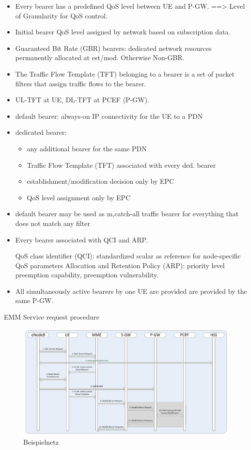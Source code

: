 \begin{itemize}
\item 	Every bearer has a predefined QoS level between UE and P-GW.
		==> Level of Granularity for QoS control.
\item	Initial bearer QoS level assigned by network based on subscription data.
\item	Guaranteed Bit Rate (GBR) bearers: dedicated network resources permanently allocated at est/mod. Otherwise Non-GBR.
\item	The Traffic Flow Template (TFT) belonging to a bearer is a set of packet filters that assign traffic flows to the bearer.
\item	UL-TFT at UE, DL-TFT at PCEF (P-GW).
\item 	default bearer: always-on IP connectivity for the UE to a PDN
\item	dedicated bearer:   
			\begin{itemize}
				\item any additional bearer for the same PDN
				\item Traffic Flow Template (TFT) associated with every ded. bearer
				\item establishment/modification decision only by EPC
				\item QoS level assignment only by EPC
			\end{itemize}

\item	default bearer may be used as {m,c}atch-all traffic bearer for everything that does not match any filter
\item	Every bearer associated with QCI and ARP.

QoS class identifier (QCI): standardized scalar as reference for node-specific QoS parameters
Allocation and Retention Policy (ARP): priority level preemption capability, preemption vulnerability.

\item	All simultaneously active bearers by one UE are provided are provided by the same P-GW.
\end{itemize}

EMM Service request procedure

\begin{figure}[htbp]
	\centering
	\includegraphics[width=1.0\textwidth]{images/3gpp/UE-service-request.pdf}
	\caption{Beispielnetz}\label{fig:3gpp-ueservicereq}
\end{figure}


